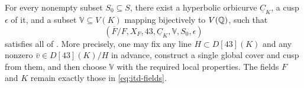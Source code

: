 \begin{theorem}\label{thm:itd-data}
For every nonempty subset $S_0\subseteq S$, there exist a
hyperbolic orbicurve $\underline C_K$, a cusp $\epsilon$ of it,
and a subset $\mathbb V\subseteq V(K)$ mapping bijectively to
$V(\mathbb Q)$, such that
\begin{equation}\label{eq:itd-tuple}
 (\overline F/F,X_F,43,\underline C_K,
        \mathbb V,S_0,\epsilon)
\end{equation}
satisfies all of \cite[Definition~3.1(a)--(f)]{IUT1}.
More precisely, one may fix any line $H\subset D[43](K)$ and any
nonzero $\bar v\in D[43](K)/H$ in advance, construct a single
global cover and cusp from them, and then choose $\mathbb V$ with
the required local properties. The fields $F$ and $K$ remain
exactly those in \eqref{eq:itd-fields}.
\end{theorem}

